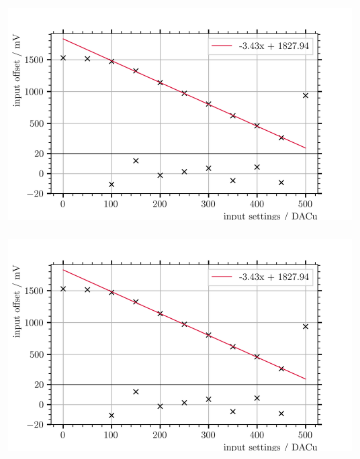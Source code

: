 \begin{figure}
	\centering
	\begin{subfigure}[b]{1.\textwidth}
		\centering
		\includegraphics[width=1.\textwidth]{pictures/input_offset_board_2_channel_0.png}
		\caption{}
		\label{fig:input_offset_b2_dac50}
	\end{subfigure}
	
	\begin{subfigure}[b]{1.\textwidth}
		\centering
		\includegraphics[width=1.\textwidth]{pictures/input_offset_board_2_channel_0.png}
		\caption{}
		\label{fig:input_offset_b2_dac50}
	\end{subfigure}


\end{figure}
